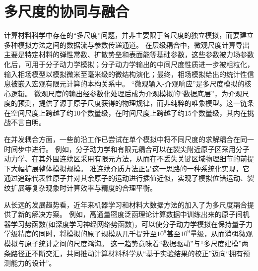 
\section{多尺度的协同与融合}
计算材料科学中存在的``多尺度''问题，并非主要限于各尺度的独立模拟，而要建立多种模拟方法之间的数据流与参数传递通道。
在层级耦合中，微观尺度计算导出主要是特定材料的弹性常数、扩散势垒和表面能等基础参数，这些参数被力场参数化后，可用于分子动力学模拟；分子动力学输出的中间尺度性质进一步被粗粒化，输入相场模型以模拟微米至毫米级的微结构演化；最终，相场模拟给出的统计性信息被嵌入宏观有限元计算的本构关系中。
“微观输入-介观响应”是多尺度模拟的核心逻辑。
微观尺度的输出经参数化处理后成为介观模拟的“数据底层”，为介观尺度的预测，提供了源于原子尺度获得的物理规律，而非纯粹的唯象模型。这一链条在空间尺度上跨越了约10个数量级，在时间尺度上跨越了约15个数量级，其内在挑战不言自明。

在并发耦合方面，一些前沿工作已尝试在单个模拟中将不同尺度的求解耦合在同一时间步中进行。
例如，分子动力学和有限元耦合可以在裂尖附近原子区采用分子动力学、在其外围连续区采用有限元方法，从而在不丢失关键区域物理细节的前提下大幅扩展整体模拟规模。
准连续介质方法正是这一思路的一种系统化实现，它通过追踪代表性原子并对其余原子的运动进行插值近似，实现了模拟位错运动、裂纹扩展等复杂现象时计算效率与精度的合理平衡。

从长远的发展趋势看，近年来机器学习和材料大数据方法的加入了为多尺度耦合提供了新的解决方案。
例如，高通量密度泛函理论计算数据中训练出来的原子间机器学习势函数(如深度学习神经网络势函数)，可以使分子动力学模拟在保持量子力学级精度的同时，将模拟的原子规模从几千提升至$10^6$甚至$10^9$量级，从而消弭微观模拟与原子统计之间的尺度鸿沟。
这一趋势意味着``数据驱动''与``多尺度建模''两条路径正不断交汇，共同推动计算材料科学从``基于实验结果的校正''迈向``拥有预测能力的设计''。

